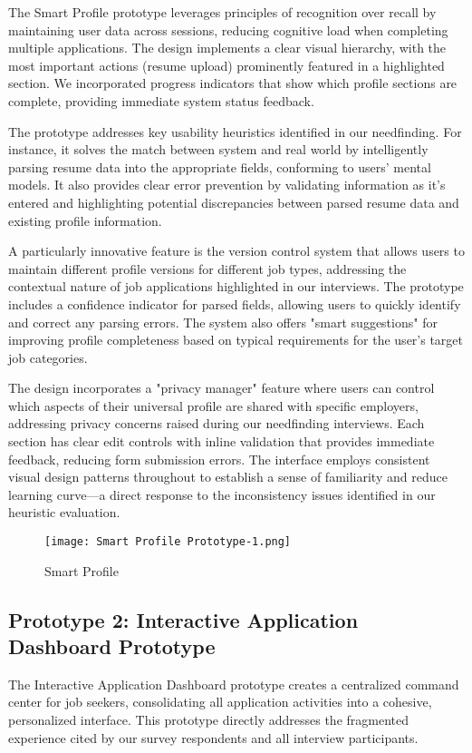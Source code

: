 \documentclass[
	letterpaper, %
]{jdf}
\begin{document}
\begin{sloppypar}
The Smart Profile prototype leverages principles of recognition over recall by maintaining user data across sessions, reducing cognitive load when completing multiple applications. The design implements a clear visual hierarchy, with the most important actions (resume upload) prominently featured in a highlighted section. We incorporated progress indicators that show which profile sections are complete, providing immediate system status feedback.

The prototype addresses key usability heuristics identified in our needfinding. For instance, it solves the match between system and real world by intelligently parsing resume data into the appropriate fields, conforming to users' mental models. It also provides clear error prevention by validating information as it's entered and highlighting potential discrepancies between parsed resume data and existing profile information.

A particularly innovative feature is the version control system that allows users to maintain different profile versions for different job types, addressing the contextual nature of job applications highlighted in our interviews. The prototype includes a confidence indicator for parsed fields, allowing users to quickly identify and correct any parsing errors. The system also offers "smart suggestions" for improving profile completeness based on typical requirements for the user's target job categories.

The design incorporates a "privacy manager" feature where users can control which aspects of their universal profile are shared with specific employers, addressing privacy concerns raised during our needfinding interviews. Each section has clear edit controls with inline validation that provides immediate feedback, reducing form submission errors. The interface employs consistent visual design patterns throughout to establish a sense of familiarity and reduce learning curve—a direct response to the inconsistency issues identified in our heuristic evaluation.

\begin{figure}
    \centering
    \texttt{[image: Smart Profile Prototype-1.png]}
    \caption{Smart Profile}
    \label{fig:enter-label}
\end{figure}

\newpage

\subsection{Prototype 2: Interactive Application Dashboard Prototype}
The Interactive Application Dashboard prototype creates a centralized command center for job seekers, consolidating all application activities into a cohesive, personalized interface. This prototype directly addresses the fragmented experience cited by our survey respondents and all interview participants.


\end{sloppypar}
\end{document}
